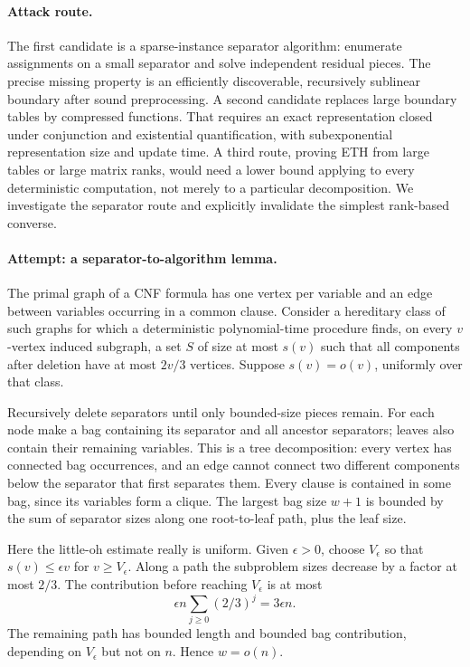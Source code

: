 \documentclass[11pt,a4paper]{article}
\numberwithin{equation}{section}
\begin{document}
\paragraph{Attack route.}
The first candidate is a sparse-instance separator algorithm: enumerate
assignments on a small separator and solve independent residual pieces.
The precise missing property is an efficiently discoverable, recursively
sublinear boundary after sound preprocessing. A second candidate replaces
large boundary tables by compressed functions. That requires an exact
representation closed under conjunction and existential quantification,
with subexponential representation size and update time. A third route,
proving ETH from large tables or large matrix ranks, would need a lower
bound applying to every deterministic computation, not merely to a
particular decomposition. We investigate the separator route and
explicitly invalidate the simplest rank-based converse.

\paragraph{Attempt: a separator-to-algorithm lemma.}
The primal graph of a CNF formula has one vertex per variable and an edge
between variables occurring in a common clause. Consider a hereditary
class of such graphs for which a deterministic polynomial-time procedure
finds, on every $v$-vertex induced subgraph, a set $S$ of size at most
$s(v)$ such that all components after deletion have at most $2v/3$
vertices. Suppose $s(v)=o(v)$, uniformly over that class.

Recursively delete separators until only bounded-size pieces remain.
For each node make a bag containing its separator and all ancestor
separators; leaves also contain their remaining variables. This is a
tree decomposition: every vertex has connected bag occurrences, and an
edge cannot connect two different components below the separator that
first separates them. Every clause is contained in some bag, since its
variables form a clique. The largest bag size $w+1$ is bounded by the
sum of separator sizes along one root-to-leaf path, plus the leaf size.

Here the little-oh estimate really is uniform. Given $\epsilon>0$, choose
$V_\epsilon$ so that $s(v)\le\epsilon v$ for $v\ge V_\epsilon$.
Along a path the subproblem sizes decrease by a factor at most $2/3$.
The contribution before reaching $V_\epsilon$ is at most
\[
 \epsilon n\sum_{j\ge0}(2/3)^j=3\epsilon n.
\]
The remaining path has bounded length and bounded bag contribution,
depending on $V_\epsilon$ but not on $n$. Hence $w=o(n)$.
\end{document}
